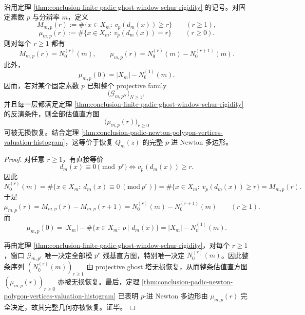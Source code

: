 \begin{theorem}\label{thm:conclusion-projective-ghost-family-recovers-valuation-histogram}
沿用定理 \ref{thm:conclusion-finite-padic-ghost-window-schur-rigidity} 的记号。对固定素数 \(p\) 与分辨率 \(m\)，定义
\[
M_{m,p}(r):=\#\{x\in X_m:\ v_p(d_m(x))\ge r\}
\qquad(r\ge 1),
\]
\[
\mu_{m,p}(r):=\#\{x\in X_m:\ v_p(d_m(x))=r\}
\qquad(r\ge 0).
\]
则对每个 \(r\ge 1\) 都有
\[
\boxed{\;
M_{m,p}(r)=N_0^{(r)}(m),\qquad
\mu_{m,p}(r)=N_0^{(r)}(m)-N_0^{(r+1)}(m).\;}
\]
此外，
\[
\mu_{m,p}(0)=|X_m|-N_0^{(1)}(m).
\]
因而，若对某个固定素数 \(p\) 已知整个 projective family
\[
\bigl(\mathcal G_{m,p^N}\bigr)_{N\ge 1},
\]
并且每一层都满足定理 \ref{thm:conclusion-finite-padic-ghost-window-schur-rigidity} 的反演条件，则全部估值直方图
\[
\bigl(\mu_{m,p}(r)\bigr)_{r\ge 0}
\]
可被无损恢复。结合定理 \ref{thm:conclusion-padic-newton-polygon-vertices-valuation-histogram}，这等价于恢复 \(Q_m(z)\) 的完整 \(p\)-进 Newton 多边形。
\end{theorem}
\begin{proof}
对任意 \(r\ge 1\)，有直接等价
\[
d_m(x)\equiv 0\pmod{p^r}
\iff
v_p(d_m(x))\ge r.
\]
因此
\[
N_0^{(r)}(m)=\#\{x\in X_m:\ d_m(x)\equiv 0\ (\mathrm{mod}\ p^r)\}
=
\#\{x\in X_m:\ v_p(d_m(x))\ge r\}
=
M_{m,p}(r).
\]
于是
\[
\mu_{m,p}(r)
=
M_{m,p}(r)-M_{m,p}(r+1)
=
N_0^{(r)}(m)-N_0^{(r+1)}(m)
\qquad(r\ge 1).
\]
而
\[
\mu_{m,p}(0)
=
|X_m|-\#\{x\in X_m:\ p\mid d_m(x)\}
=
|X_m|-N_0^{(1)}(m).
\]

再由定理 \ref{thm:conclusion-finite-padic-ghost-window-schur-rigidity}，对每个 \(r\ge 1\)，窗口 \(\mathcal G_{m,p^r}\) 唯一决定全部模 \(p^r\) 残基直方图，特别唯一决定 \(N_0^{(r)}(m)\)。因此整条序列 \((N_0^{(r)}(m))_{r\ge 1}\) 由 projective ghost 塔无损恢复，从而整条估值直方图 \((\mu_{m,p}(r))_{r\ge 0}\) 亦被无损恢复。最后，定理 \ref{thm:conclusion-padic-newton-polygon-vertices-valuation-histogram} 已表明 \(p\)-进 Newton 多边形由 \(\mu_{m,p}(r)\) 完全决定，故其完整几何亦被恢复。证毕。
\end{proof}

